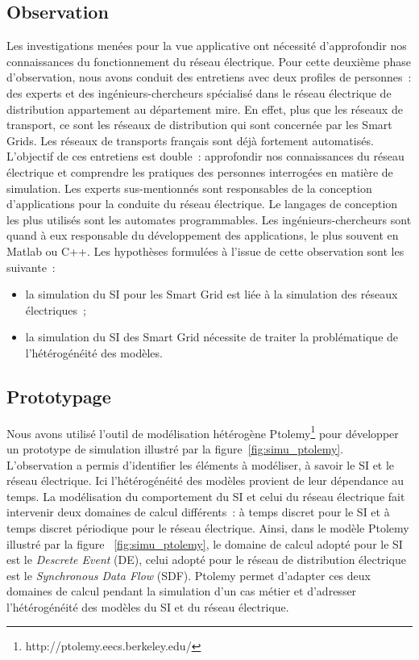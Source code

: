 				\subsection{Observation}
				Les investigations menées pour la vue applicative ont nécessité d'approfondir nos connaissances du fonctionnement du réseau électrique. Pour cette deuxième phase d'observation, nous avons conduit des entretiens avec deux profiles de personnes~: des experts et des ingénieurs-chercheurs spécialisé dans le réseau électrique de distribution  appartement au département \gls{mire}. En effet, plus que les réseaux de transport, ce sont les réseaux de distribution qui sont concernée par les Smart Grids. Les réseaux de transports français sont déjà fortement automatisés. 
				L'objectif de ces entretiens est double~: approfondir nos connaissances du réseau électrique et comprendre les pratiques des personnes interrogées en matière de simulation.
				Les experts sus-mentionnés sont responsables de la conception d'applications pour la conduite du réseau électrique. Le langages de conception les plus utilisés sont les automates programmables. Les ingénieurs-chercheurs sont quand à eux responsable du développement des applications, le plus souvent en Matlab ou  C++.
				Les hypothèses formulées à l'issue de cette observation sont les suivante~:
				\begin{itemize}
					\item la simulation du SI pour les Smart Grid est liée à la simulation des réseaux électriques~;
					\item la simulation du SI des Smart Grid nécessite de traiter la problématique de l'hétérogénéité des modèles.
				\end{itemize}
				
				\subsection{Prototypage}
				
				Nous avons utilisé l'outil de modélisation hétérogène Ptolemy\footnote{http://ptolemy.eecs.berkeley.edu/}  pour développer un prototype de simulation illustré par la figure~\ref{fig:simu_ptolemy}. L'observation a permis d'identifier les éléments à modéliser, à savoir le SI et le réseau électrique. Ici l'hétérogénéité des modèles provient de leur dépendance au temps. La modélisation du comportement du SI et celui du réseau électrique fait intervenir deux domaines de calcul différents~: à temps discret pour le SI et à temps discret périodique pour le réseau électrique. 
				Ainsi, dans le modèle Ptolemy illustré par la figure ~\ref{fig:simu_ptolemy}, le domaine de calcul adopté pour le SI est le \textit{Descrete Event} (DE), celui adopté pour le réseau de distribution électrique est le \textit{Synchronous Data Flow} (SDF). Ptolemy permet d'adapter ces deux domaines de calcul pendant la simulation d'un cas métier et d'adresser l'hétérogénéité des modèles du SI et du réseau électrique. 
				
